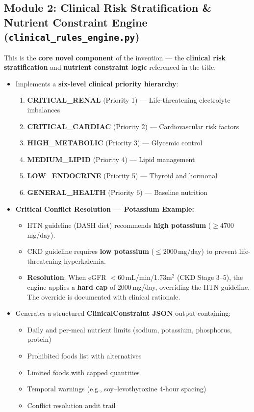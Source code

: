 \documentclass[a4paper,12pt]{article}
\begin{document}
\subsection*{Module 2: Clinical Risk Stratification \& Nutrient Constraint Engine (\texttt{clinical\_rules\_engine.py})}

This is the \textbf{core novel component} of the invention --- the \textbf{clinical risk stratification} and \textbf{nutrient constraint logic} referenced in the title.

\begin{itemize}[itemsep=0.3em]
    \item Implements a \textbf{six-level clinical priority hierarchy}:
    \begin{enumerate}
        \item \textbf{CRITICAL\_RENAL} (Priority 1) --- Life-threatening electrolyte imbalances
        \item \textbf{CRITICAL\_CARDIAC} (Priority 2) --- Cardiovascular risk factors
        \item \textbf{HIGH\_METABOLIC} (Priority 3) --- Glycemic control
        \item \textbf{MEDIUM\_LIPID} (Priority 4) --- Lipid management
        \item \textbf{LOW\_ENDOCRINE} (Priority 5) --- Thyroid and hormonal
        \item \textbf{GENERAL\_HEALTH} (Priority 6) --- Baseline nutrition
    \end{enumerate}

    \item \textbf{Critical Conflict Resolution --- Potassium Example:}
    \begin{itemize}
        \item HTN guideline (DASH diet) recommends \textbf{high potassium} ($\geq 4700$\,mg/day).
        \item CKD guideline requires \textbf{low potassium} ($\leq 2000$\,mg/day) to prevent life-threatening hyperkalemia.
        \item \textbf{Resolution}: When eGFR $< 60$\,mL/min/1.73m$^2$ (CKD Stage 3--5), the engine applies a \textbf{hard cap} of 2000\,mg/day, overriding the HTN guideline. The override is documented with clinical rationale.
    \end{itemize}

    \item Generates a structured \textbf{ClinicalConstraint JSON} output containing:
    \begin{itemize}
        \item Daily and per-meal nutrient limits (sodium, potassium, phosphorus, protein)
        \item Prohibited foods list with alternatives
        \item Limited foods with capped quantities
        \item Temporal warnings (e.g., soy--levothyroxine 4-hour spacing)
        \item Conflict resolution audit trail
    \end{itemize}


\end{itemize}
\end{document}
